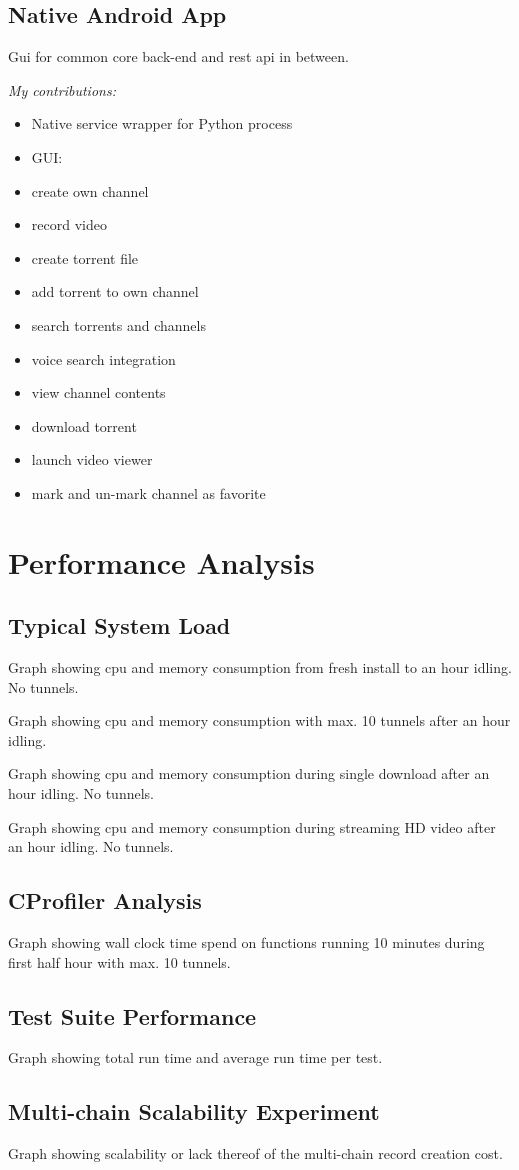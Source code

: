 \documentclass[]{report}
\begin{document}
\section{Native Android App}
Gui for common core back-end and rest api in between.

\emph{My contributions:}
\begin{itemize}
	\item Native service wrapper for Python process
	\item GUI:
	\item create own channel
	\item record video
	\item create torrent file
	\item add torrent to own channel
	\item search torrents and channels
	\item voice search integration
	\item view channel contents
	\item download torrent
	\item launch video viewer
	\item mark and un-mark channel as favorite
\end{itemize}



\chapter{Performance Analysis}

\section{Typical System Load}
Graph showing cpu and memory consumption from fresh install to an hour idling. No tunnels.

Graph showing cpu and memory consumption with max. 10 tunnels after an hour idling.

Graph showing cpu and memory consumption during single download after an hour idling. No tunnels.

Graph showing cpu and memory consumption during streaming HD video after an hour idling. No tunnels.


\section{CProfiler Analysis}
Graph showing wall clock time spend on functions running 10 minutes during first half hour with max. 10 tunnels.


\section{Test Suite Performance}
Graph showing total run time and average run time per test.


\section{Multi-chain Scalability Experiment}
Graph showing scalability or lack thereof of the multi-chain record creation cost.
\end{document}
